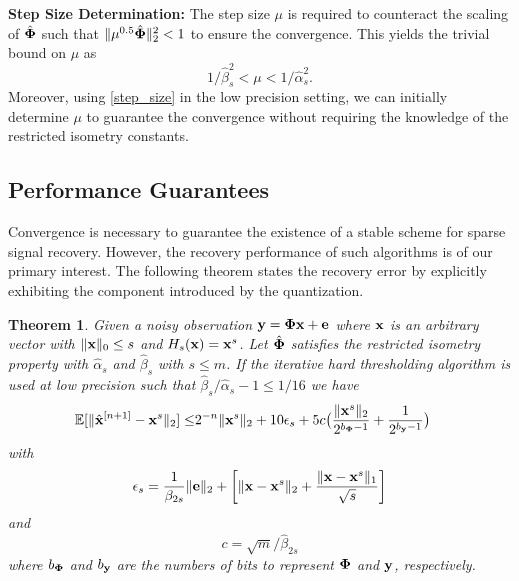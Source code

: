 \documentclass{article}
\newtheorem{theorem}{Theorem}
\begin{document}
{\bf Step Size Determination:} The step size $\mu$ is required to counteract the scaling of $\hat{{\bf \Phi}}$ such that $\|\mu^{0.5} \hat{\bf\Phi}\|_2^2 <1$ to ensure the convergence. This yields the trivial bound on $\mu$ as
\begin{equation}
    1/\hat{\beta}_s^2 < \mu < 1/\hat{\alpha}_s^2.
\end{equation}
Moreover, using \ref{step_size} in the low precision setting, we can initially determine $\mu$ to guarantee the convergence without requiring the knowledge of the restricted isometry constants.

 \subsection{Performance Guarantees}
 Convergence is necessary to guarantee the existence of a stable scheme for sparse signal recovery. However, the recovery performance of such algorithms is of our primary interest. The following theorem states the recovery error by explicitly exhibiting the component introduced by the quantization.
\begin{theorem}
Given a noisy observation ${\bf y} = {\bf \Phi x}+{\bf e} $ where ${\bf x}$ is an arbitrary vector with $\|{\bf x} \|_0 \leq s$ and $H_s({\bf x}) = {\bf x}^s$. Let $\hat{\bf \Phi}$ satisfies the restricted isometry property with $\hat{\alpha}_s$ and $\hat{\beta}_s$ with $s\leq m$. If the iterative hard thresholding algorithm is used at low precision such that $\hat{\beta}_s/\hat{\alpha}_s -1 \leq 1/16$ we have
\begin{equation}
\begin{split}
        \mathbb{E}[\|\hat{{\bf x}}^{[n+1]}-{\bf x}^s\|_2]  
        \leq &2^{-n}\|{\bf x}^{s}\|_2  + 10\epsilon_s + 5c\big ( \frac{\| {\bf x}^s\|_2}{2^{b_{\bf \Phi}-1}}+\frac{1}{2^{b_{\bf y}-1}} \big )
\end{split}
\end{equation}
with 
\begin{equation}
\epsilon_s = \frac{1}{\beta_{2s}}\|{\bf e} \|_2 +\bigg  [ \|{\bf x}-{\bf x}^s \|_2 + \frac{\|{\bf x}-{\bf x}^s \|_1}{\sqrt{s}}\bigg]    
\end{equation}
and
\begin{equation}
c = {\sqrt{m}}/{\hat{\beta}_{2s}}  
\end{equation}
where $b_{\bf \Phi}$ and $b_{\bf y}$ are the numbers of bits to represent ${\bf \Phi}$ and ${\bf y}$, respectively.
\end{theorem}
\end{document}
